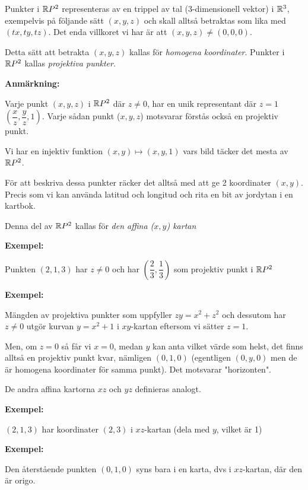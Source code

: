 \par\bigskip
\noindent Punkter i $\mathbb{R} P^2$ representeras av en trippel av tal (3-dimensionell vektor) i $\mathbb{R}^3$, exempelvis på följande sätt $(x,y,z)$ och skall alltså betraktas som lika med $(tx,ty,tz)$. Det enda villkoret vi har är att $(x,y,z)\neq(0,0,0)$.\par
\noindent Detta sätt att betrakta $(x,y,z)$ kallas för \textit{homogena koordinater}. Punkter i $\mathbb{R} P^2$ kallas \textit{projektiva punkter}.
\par\bigskip
\noindent\textbf{Anmärkning:}\par
\noindent Varje punkt $(x,y,z)$ i $\mathbb{R} P^2$ där $z\neq0$, har en unik representant där $z=1$ $\left(\dfrac{x}{z},\dfrac{y}{z},1\right)$. Varje sådan punkt ($x,y,z$) motsvarar förstås också en projektiv punkt.\par
\noindent Vi har en injektiv funktion $(x,y)\mapsto(x,y,1)$ vars bild täcker det mesta av $\mathbb{R} P^2$.\par
\noindent För att beskriva dessa punkter räcker det alltså med att ge 2 koordinater $(x,y)$. Precis som vi kan använda latitud och longitud och rita en bit av jordytan i en kartbok.\par
\noindent Denna del av $\mathbb{R} P^2$ kallas för \textit{den affina ($x,y$) kartan}
\par\bigskip
\noindent\textbf{Exempel:}\par
\noindent Punkten $(2,1,3)$  har $z\neq0$ och har $\left(\dfrac{2}{3},\dfrac{1}{3}\right)$ som projektiv punkt i $\mathbb{R} P^2$
\par\bigskip
\noindent\textbf{Exempel:}\par
\noindent Mängden av projektiva punkter som uppfyller $zy = x^2+z^2$ och dessutom har $z\neq0$ utgör kurvan $y=x^2+1$ i $xy$-kartan eftersom vi sätter $z=1$.\par
\noindent Men, om $z=0$ så får vi $x=0$, medan $y$ kan anta vilket värde som helst, det finns alltså en projektiv punkt kvar, nämligen $(0,1,0)$ (egentligen $(0,y,0)$ men de är homogena koordinater för samma punkt). Det motsvarar "horizonten".
\par\bigskip
\noindent De andra affina kartorna $xz$ och $yz$  definieras analogt.
\par\bigskip
\noindent\textbf{Exempel:}\par
\noindent $(2,1,3)$ har koordinater $(2,3)$ i $xz$-kartan (dela med $y$, vilket är 1)
\par\bigskip
\noindent\textbf{Exempel:}\par
\noindent Den återstående punkten $(0,1,0)$ syns bara i en karta, dvs i $xz$-kartan, där den är origo.
